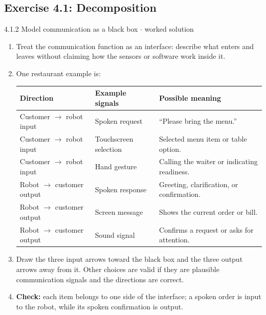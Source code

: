 \documentclass[11pt]{article}
\begin{document}
\begin{keepsection}\subsection{Exercise 4.1: Decomposition}

\begin{workedbox}{4.1.2 Model communication as a black box \ensuremath{\cdot} worked solution}
\begin{enumerate}
\item Treat the communication function as an interface: describe what enters and leaves without claiming how the sensors or software work inside it.
\item {}
One restaurant example is:

\begin{center}\small\begin{tabularx}{\linewidth}{>{\raggedright\arraybackslash}X>{\raggedright\arraybackslash}X>{\raggedright\arraybackslash}X}\toprule
\textbf{Direction} & \textbf{Example signals} & \textbf{Possible meaning} \\ \midrule
Customer \ensuremath{\to} robot input & Spoken request & “Please bring the menu.” \\
Customer \ensuremath{\to} robot input & Touchscreen selection & Selected menu item or table option. \\
Customer \ensuremath{\to} robot input & Hand gesture & Calling the waiter or indicating readiness. \\
Robot \ensuremath{\to} customer output & Spoken response & Greeting, clarification, or confirmation. \\
Robot \ensuremath{\to} customer output & Screen message & Shows the current order or bill. \\
Robot \ensuremath{\to} customer output & Sound signal & Confirms a request or asks for attention. \\
\bottomrule\end{tabularx}\end{center}
\item Draw the three input arrows toward the black box and the three output arrows away from it. Other choices are valid if they are plausible communication signals and the directions are correct.
\item \textbf{Check:} each item belongs to one side of the interface; a spoken order is input to the robot, while its spoken confirmation is output.
\end{enumerate}
\end{workedbox}

\end{keepsection}
\end{document}
